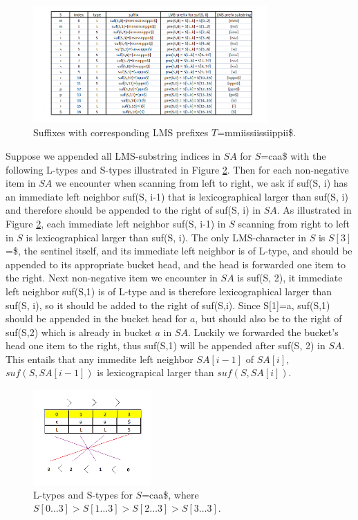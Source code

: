 \documentclass[12pt]{article} %
\begin{document}
\begin{figure}[H]
    \centering
    \includegraphics[width=0.8\textwidth]{lmsprefix}
    \captionsetup{width=0.8\textwidth}
    \caption{Suffixes with corresponding LMS prefixes $T$=mmiissiissiippii\$.}
    \label{fig:lmsprefix}  
\end{figure}
Suppose we appended all LMS-substring indices in $SA$ for $S$=caa\$ with the following L-types and S-types illustrated in Figure \ref{fig:ltypedescription}. Then for each non-negative item in $SA$ we encounter when scanning from left to right, we ask if suf(S, i) has an immediate left neighbor suf(S, i-1) that is lexicographical larger than suf(S, i) and therefore should be appended to the right of suf(S, i) in $SA$. As illustrated in Figure \ref{fig:ltypedescription}, each immediate left neighbor suf(S, i-1) in $S$ scanning from right to left in $S$ is lexicographical larger than suf(S, i). The only LMS-character in $S$ is $S[3]$=\$, the sentinel itself, and its immediate left neighbor is of L-type, and should be appended to its appropriate bucket head, and the head is forwarded one item to the right. Next non-negative item we encounter in $SA$ is suf(S, 2), it immediate left neighbor suf(S,1) is of L-type and is therefore lexicographical larger than suf(S, i), so it should be added to the right of suf(S,i). Since S[1]=a, suf(S,1) should be appended in the bucket head for $a$, but should also be to the right of suf(S,2) which is already in bucket $a$ in $SA$. Luckily we forwarded the bucket's head one item to the right, thus suf(S,1) will be appended after suf(S, 2) in $SA$. This entails that any immedite left neighbor $SA[i-1]$ of $SA[i]$, $suf(S, SA[i-1])$ is lexicograpical larger than $suf(S, SA[i])$.
\begin{figure}[H]
    \centering
    \includegraphics[width=0.4\textwidth]{ltypedescription}
    \captionsetup{width=0.8\textwidth}
    \caption{L-types and S-types for $S$=caa\$, where $S[0 \dots 3] > S[1 \dots 3] > S[2 \dots 3] > S[3 \dots 3]$.}
    \label{fig:ltypedescription}  
\end{figure}
\end{document}
